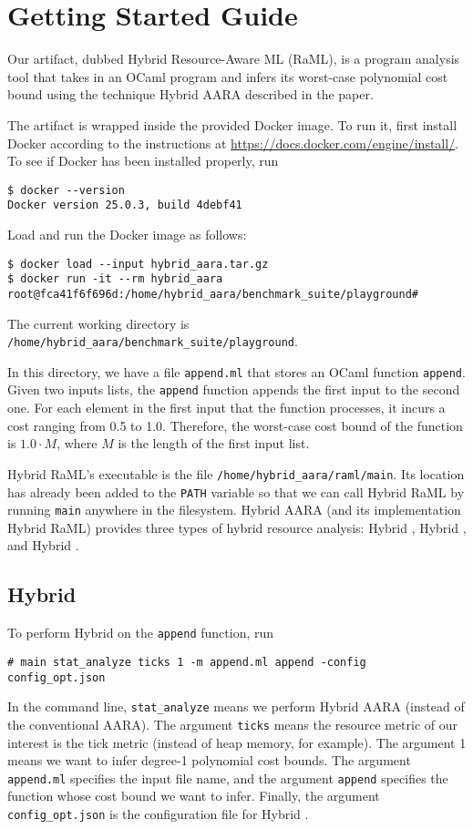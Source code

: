
\section{Getting Started Guide}

Our artifact, dubbed Hybrid Resource-Aware ML (RaML), is a program analysis tool
that takes in an OCaml program and infers its worst-case polynomial cost bound
using the technique Hybrid AARA described in the paper.

The artifact is wrapped inside the provided Docker image.
%
To run it, first install Docker according to the instructions at
\url{https://docs.docker.com/engine/install/}.
%
To see if Docker has been installed properly, run
\begin{verbatim}
$ docker --version
Docker version 25.0.3, build 4debf41
\end{verbatim}

Load and run the Docker image as follows:
\begin{verbatim}
$ docker load --input hybrid_aara.tar.gz
$ docker run -it --rm hybrid_aara
root@fca41f6f696d:/home/hybrid_aara/benchmark_suite/playground#
\end{verbatim}
The current working directory is
\texttt{/home/hybrid\_aara/benchmark\_suite/playground}.

In this directory, we have a file \texttt{append.ml} that stores an OCaml
function \texttt{append}.
%
Given two inputs lists, the \texttt{append} function appends the first input to
the second one.
%
For each element in the first input that the function processes, it incurs a
cost ranging from 0.5 to 1.0.
%
Therefore, the worst-case cost bound of the function is $1.0 \cdot M$, where $M$
is the length of the first input list.

Hybrid RaML's executable is the file \texttt{/home/hybrid\_aara/raml/main}.
%
Its location has already been added to the \texttt{PATH} variable so that we can
call Hybrid RaML by running \texttt{main} anywhere in the filesystem.
%
Hybrid AARA (and its implementation Hybrid RaML) provides three types of hybrid
resource analysis: Hybrid \Opt{}, Hybrid \BayesWC{}, and Hybrid \BayesPC{}.

\subsection{Hybrid \Opt{}}

To perform Hybrid \Opt{} on the \texttt{append} function, run
\begin{verbatim}
# main stat_analyze ticks 1 -m append.ml append -config config_opt.json
\end{verbatim}
%
In the command line, \texttt{stat\_analyze} means we perform Hybrid AARA
(instead of the conventional AARA).
%
The argument \texttt{ticks} means the resource metric of our interest is the
tick metric (instead of heap memory, for example).
%
The argument 1 means we want to infer degree-1 polynomial cost bounds.
%
The argument \texttt{append.ml} specifies the input file name, and the argument
\texttt{append} specifies the function whose cost bound we want to infer.
%
Finally, the argument \texttt{config\_opt.json} is the configuration file for
Hybrid \Opt{}.

